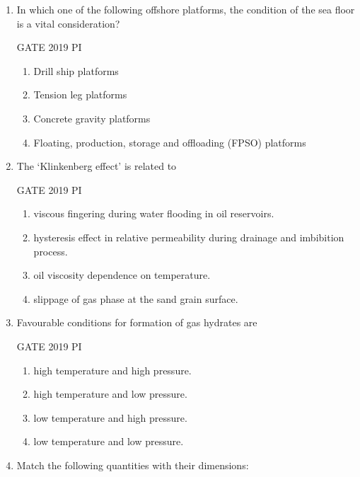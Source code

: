 \documentclass[journal,12pt,onecolumn]{IEEEtran}
\theoremstyle{remark}
\begin{document}
\begin{enumerate}
\hfill{GATE 2019 PI}

\begin{multicols}{2}
\begin{enumerate}
    \item Tension leg platforms
    \item Jack up platforms
    \item Spar platforms
    \item Semi-submersible platforms
\end{enumerate}
\end{multicols}

\item In which one of the following offshore platforms, the condition of the sea floor is a vital consideration?

\hfill{GATE 2019 PI}

\begin{multicols}{2}
\begin{enumerate}
    \item Drill ship platforms
    \item Tension leg platforms
    \item Concrete gravity platforms
    \item Floating, production, storage and offloading (FPSO) platforms
\end{enumerate}
\end{multicols}

\item The `Klinkenberg effect' is related to

\hfill{GATE 2019 PI}

\begin{multicols}{2}
\begin{enumerate}
    \item viscous fingering during water flooding in oil reservoirs.
    \item hysteresis effect in relative permeability during drainage and imbibition process.
    \item oil viscosity dependence on temperature.
    \item slippage of gas phase at the sand grain surface.
\end{enumerate}
\end{multicols}

\item Favourable conditions for formation of gas hydrates are

\hfill{GATE 2019 PI}

\begin{multicols}{2}
\begin{enumerate}
    \item high temperature and high pressure.
    \item high temperature and low pressure.
    \item low temperature and high pressure.
    \item low temperature and low pressure.
\end{enumerate}
\end{multicols}
\item Match the following quantities with their dimensions:


\end{enumerate}
\end{document}
